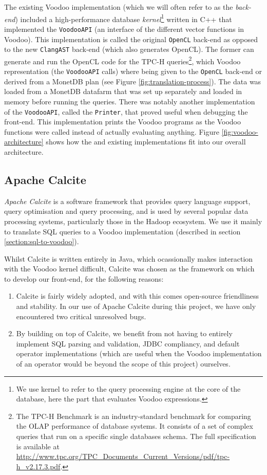 The existing Voodoo implementation (which we will often refer to as the \emph{back-end}) included a high-performance database \emph{kernel}\footnote{We use kernel to refer to the query processing engine at the core of the database, here the part that evaluates Voodoo expressions.} written in C++ that implemented the \texttt{VoodooAPI} (an interface of the different vector functions in Voodoo). This implementation is called the original \texttt{OpenCL} back-end as opposed to the new \texttt{ClangAST} back-end (which also generates OpenCL). The former can generate and run the OpenCL code for the TPC-H queries\footnote{The TPC-H Benchmark is an industry-standard benchmark for comparing the OLAP performance of database systems. It consists of a set of complex queries that run on a specific single databases schema. The full specification is available at \url{http://www.tpc.org/TPC_Documents_Current_Versions/pdf/tpc-h_v2.17.3.pdf}.}, which Voodoo representation (the \texttt{VoodooAPI} calls) where being given to the \texttt{OpenCL} back-end or derived from a MonetDB plan (see Figure \ref{fig:translation-process}). The data was loaded from a MonetDB datafarm that was set up separately and loaded in memory before running the queries. There was notably another implementation of the \texttt{VoodooAPI}, called the \texttt{Printer}, that proved useful when debugging the front-end. This implementation prints the Voodoo programs as the Voodoo functions were called instead of actually evaluating anything. Figure \ref{fig:voodoo-architecture} shows how the  and existing implementations fit into our overall architecture.

\subsection{Apache Calcite}

\emph{Apache Calcite} \cite{Begoli:2018:ACF:3183713.3190662} is a software framework that provides query language support, query optimisation and query processing, and is used by several popular data processing systems, particularly those in the Hadoop ecosystem. We use it mainly to translate SQL queries to a Voodoo implementation (described in section \ref{section:sql-to-voodoo}).

Whilst Calcite is written entirely in Java, which ocassionally makes interaction with the Voodoo kernel difficult, Calcite was chosen as the framework on which to develop our front-end, for the following reasons:

\begin{enumerate}
    \item Calcite is fairly widely adopted, and with this comes open-source friendliness and stability. In our use of Apache Calcite during this project, we have only encountered two critical unresolved bugs.
    \item By building on top of Calcite, we benefit from not having to entirely implement SQL parsing and validation, JDBC compliancy, and default operator implementations (which are useful when the Voodoo implementation of an operator would be beyond the scope of this project) ourselves.
\end{enumerate}
 
